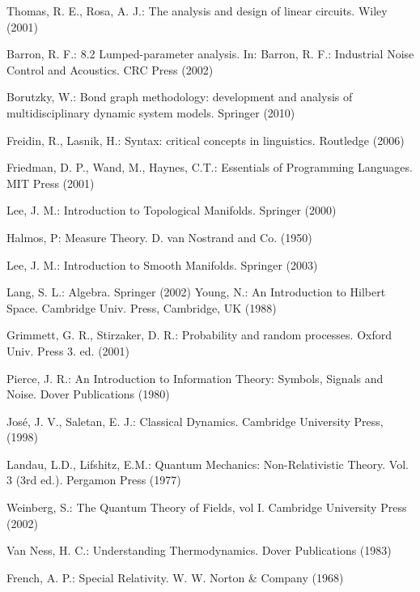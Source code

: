\documentclass[smallextended]{svjour3}
\numberwithin{equation}{section}
\theoremstyle{definition}
\begin{document}
\begin{thebibliography}{0}
Thomas, R. E., Rosa, A. J.: The analysis and design of linear circuits. Wiley (2001) 

 Barron, R. F.: 8.2 Lumped-parameter analysis. In: Barron, R. F.: Industrial Noise Control and Acoustics. CRC Press (2002)

 Borutzky, W.: Bond graph methodology: development and analysis of multidisciplinary dynamic system models.
Springer (2010) 

 Freidin, R., Lasnik, H.: Syntax: critical concepts in linguistics. Routledge (2006) 

 Friedman, D. P., Wand, M., Haynes, C.T.: Essentials of Programming Languages. MIT Press (2001)

 Lee, J. M.: Introduction to Topological Manifolds. Springer (2000)

 Halmos, P: Measure Theory. D. van Nostrand and Co. (1950)

 Lee, J. M.: Introduction to Smooth Manifolds. Springer (2003)

 Lang, S. L.: Algebra. Springer (2002)
 Young, N.: An Introduction to Hilbert Space. Cambridge Univ. Press, Cambridge, UK (1988)

 Grimmett, G. R., Stirzaker, D. R.: Probability and random processes. Oxford Univ. Press 3. ed. (2001) 

 Pierce, J. R.: An Introduction to Information Theory: Symbols, Signals and Noise. Dover Publications (1980)

 Jos\'{e}, J. V., Saletan, E. J.: Classical Dynamics. Cambridge University Press, (1998)

 Landau, L.D., Lifshitz, E.M.: Quantum Mechanics: Non-Relativistic Theory. Vol. 3 (3rd ed.). Pergamon Press (1977)

 Weinberg, S.: The Quantum Theory of Fields, vol I. Cambridge University Press (2002)

 Van Ness, H. C.: Understanding Thermodynamics. Dover Publications (1983)

 French, A. P.: Special Relativity. W. W. Norton \& Company (1968)


\end{thebibliography}
\end{document}
